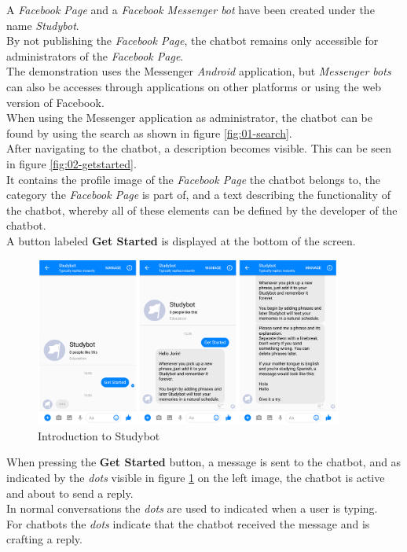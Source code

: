 A \emph{Facebook Page} and a \emph{Facebook Messenger bot} have been created under the name \emph{Studybot}.
\\
By not publishing the \emph{Facebook Page}, the chatbot remains only accessible for administrators of the \emph{Facebook Page}.
\\

The demonstration uses the Messenger \emph{Android} application,
but \emph{Messenger bots} can also be accesses through applications on other platforms
or using the web version of Facebook.
\\

When using the Messenger application as administrator,
the chatbot can be found by using the search as shown in figure \ref{fig:01-search}.
\\

After navigating to the chatbot,
a description becomes visible.
This can be seen in figure \ref{fig:02-getstarted}.
\\
It contains the profile image of the \emph{Facebook Page} the chatbot belongs to,
the category the \emph{Facebook Page} is part of,
and a text describing the functionality of the chatbot,
whereby all of these elements can be defined by the developer of the chatbot.
\\
A button labeled \textbf{Get Started} is displayed at the bottom of the screen.
\\

\begin{figure}[h]
  \centering
  \includegraphics[width=0.9\textwidth]{images/interface/03-welcome.png}
	\caption{Introduction to Studybot}
	\label{fig:03-welcome}
\end{figure}

When pressing the \textbf{Get Started} button, a message is sent to the chatbot,
and as indicated by the \emph{dots} visible in figure \ref{fig:03-welcome} on the left image,
the chatbot is active and about to send a reply.
\\
In normal conversations the \emph{dots} are used to indicated when a user is typing.
\\
For chatbots the \emph{dots} indicate that the chatbot received the message and is crafting a reply.
\\

